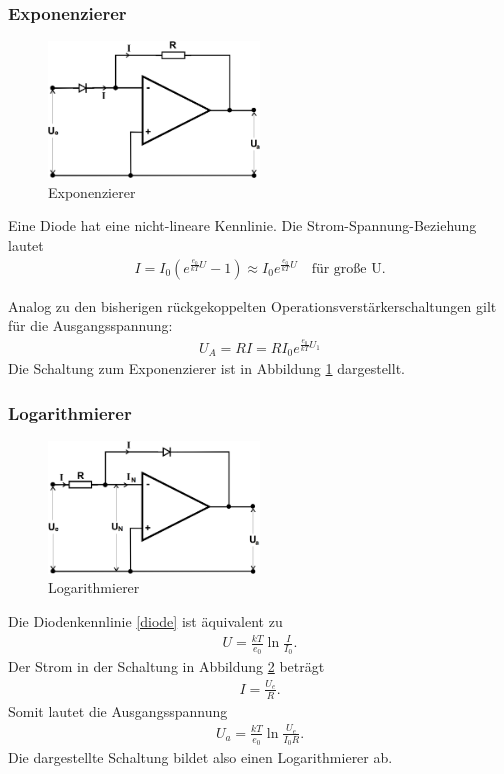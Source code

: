 \subsubsection{Exponenzierer}

\begin{figure}
	\centering
	\includegraphics[width=0.5\textwidth]{img/exp.png}
	\caption{Exponenzierer \cite{v51}}
	\label{fig:exp}
\end{figure}

Eine Diode hat eine nicht-lineare Kennlinie.
Die Strom-Spannung-Beziehung lautet
\begin{align}
	I = I_0 \left( e^{\frac{e_0}{kT}U} - 1 \right) \approx I_0 e^{\frac{e_0}{kT} U} \quad \text{für große U.}
	\label{diode}
\end{align}

Analog zu den bisherigen rückgekoppelten Operationsverstärkerschaltungen gilt für die Ausgangsspannung:
\begin{align}
	U_A = R I = R I_0 e^{\frac{e_0}{kT} U_1}
\end{align}
Die Schaltung zum Exponenzierer ist in Abbildung \ref{fig:exp} dargestellt.

\subsubsection{Logarithmierer}

\begin{figure}
	\centering
	\includegraphics[width=0.5\textwidth]{img/log.png}
	\caption{Logarithmierer \cite{v51}}
	\label{fig:log}
\end{figure}

Die Diodenkennlinie \eqref{diode} ist äquivalent zu
\begin{align}
	U = \frac{kT}{e_0} \ln \frac{I}{I_0}.
\end{align}
Der Strom in der Schaltung in Abbildung \ref{fig:log} beträgt
\begin{align}
	I = \frac{U_e}{R}.
\end{align}
Somit lautet die Ausgangsspannung
\begin{align}
	U_a = \frac{kT}{e_0} \ln \frac{U_e}{I_0 R}.
\end{align}
Die dargestellte Schaltung bildet also einen Logarithmierer ab.